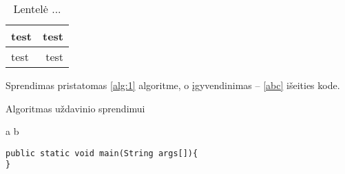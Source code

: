 \documentclass[a4paper,12pt,fleqn]{article}
\begin{document}
\begin{table}[!ht]\centering
\caption{Lentelė ... }
\label{tabl:table}
\begin{tabular}{l|r|}
test&test\\ \hline
test&test\\
\end{tabular}
\end{table}

Sprendimas pristatomas \ref{alg:1} algoritme, o įgyvendinimas -- \ref{abc} išeities kode.

\begin{algorithm}\caption{Algoritmas uždavinio sprendimui}
  \label{alg:1}
  \begin{algorithmic}
    \REQUIRE 
    \ENSURE 
\STATE a \AND b 
\end{algorithmic}


\end{algorithm}



\begin{lstlisting}[caption={Pagrindinio metodo žingsniai},label={abc}]
public static void main(String args[]){
}
\end{lstlisting}








\end{document}
